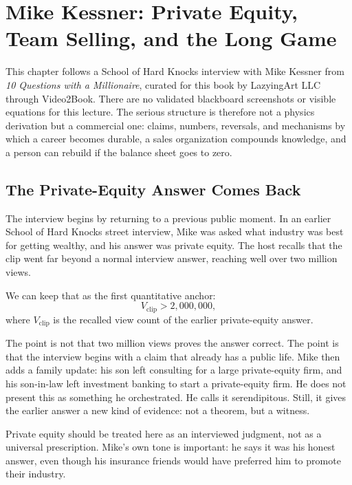 \chapter{Mike Kessner: Private Equity, Team Selling, and the Long Game}

This chapter follows a School of Hard Knocks interview with Mike Kessner from \emph{10 Questions with a Millionaire}, curated for this book by LazyingArt LLC through Video2Book. There are no validated blackboard screenshots or visible equations for this lecture. The serious structure is therefore not a physics derivation but a commercial one: claims, numbers, reversals, and mechanisms by which a career becomes durable, a sales organization compounds knowledge, and a person can rebuild if the balance sheet goes to zero.

\section{The Private-Equity Answer Comes Back}

The interview begins by returning to a previous public moment. In an earlier School of Hard Knocks street interview, Mike was asked what industry was best for getting wealthy, and his answer was private equity. The host recalls that the clip went far beyond a normal interview answer, reaching well over two million views.

We can keep that as the first quantitative anchor:
\begin{equation}
V_{\text{clip}} > 2{,}000{,}000,
\end{equation}
where \(V_{\text{clip}}\) is the recalled view count of the earlier private-equity answer.

The point is not that two million views proves the answer correct. The point is that the interview begins with a claim that already has a public life. Mike then adds a family update: his son left consulting for a large private-equity firm, and his son-in-law left investment banking to start a private-equity firm. He does not present this as something he orchestrated. He calls it serendipitous. Still, it gives the earlier answer a new kind of evidence: not a theorem, but a witness.

\begin{remark}
Private equity should be treated here as an interviewed judgment, not as a universal prescription. Mike's own tone is important: he says it was his honest answer, even though his insurance friends would have preferred him to promote their industry.
\end{remark}

